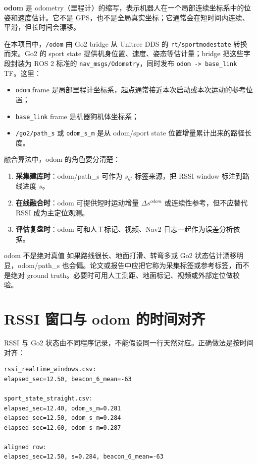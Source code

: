 \documentclass[11pt,a4paper,openany]{report}
\newcommand{\code}[1]{\nolinkurl{#1}}
\newcommand{\topic}[1]{\nolinkurl{#1}}
\newcommand{\csvcol}[1]{\nolinkurl{#1}}
\begin{document}
\textbf{odom} 是 odometry（里程计）的缩写，表示机器人在一个局部连续坐标系中的位姿和速度估计。它不是 GPS，也不是全局真实坐标；它通常会在短时间内连续、平滑，但长时间会漂移。

在本项目中，\topic{/odom} 由 Go2 bridge 从 Unitree DDS 的 \code{rt/sportmodestate} 转换而来。Go2 的 sport state 提供机身位置、速度、姿态等估计量；bridge 把这些字段封装为 ROS 2 标准的 \code{nav_msgs/Odometry}，同时发布 \topic{odom -> base_link} TF。这里：

\begin{itemize}
  \item \code{odom} frame 是局部里程计坐标系，起点通常接近本次启动或本次运动的参考位置；
  \item \code{base_link} frame 是机器狗机体坐标系；
  \item \topic{/go2/path_s} 或 \csvcol{odom_s_m} 是从 odom/sport state 位置增量累计出来的路径长度。
\end{itemize}

融合算法中，odom 的角色要分清楚：

\begin{enumerate}
  \item \textbf{采集建库时}：odom/path\_s 可作为 \(s_{gt}\) 标签来源，把 RSSI window 标注到路线进度 \(s\)。
  \item \textbf{在线融合时}：odom 可提供短时运动增量 \(\Delta s^{odom}\) 或连续性参考，但不应替代 RSSI 成为主定位观测。
  \item \textbf{评估复盘时}：odom 可和人工标记、视频、Nav2 日志一起作为误差分析依据。
\end{enumerate}

\begin{warnbox}{odom 不是绝对真值}
如果路线很长、地面打滑、转弯多或 Go2 状态估计漂移明显，odom/path\_s 也会偏。论文或报告中应把它称为采集标签或参考标签，而不是绝对 ground truth。必要时可用人工测距、地面标记、视频或外部定位做校验。
\end{warnbox}

\section{RSSI 窗口与 odom 的时间对齐}

RSSI 与 Go2 状态由不同程序记录，不能假设同一行天然对应。正确做法是按时间对齐：

\begin{lstlisting}
rssi_realtime_windows.csv:
elapsed_sec=12.50, beacon_6_mean=-63

sport_state_straight.csv:
elapsed_sec=12.40, odom_s_m=0.281
elapsed_sec=12.50, odom_s_m=0.284
elapsed_sec=12.60, odom_s_m=0.287

aligned row:
elapsed_sec=12.50, s=0.284, beacon_6_mean=-63
\end{lstlisting}
\end{document}
